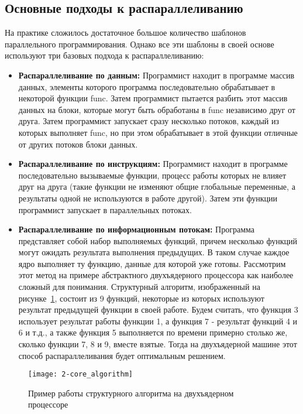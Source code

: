 \subsection{Основные подходы к распараллеливанию}

На практике сложилось достаточное большое количество шаблонов параллельного программирования.
Однако все эти шаблоны в своей основе используют три базовых подхода к распараллеливанию:

\begin{itemize}
    \item\textbf{Распараллеливание по данным:} Программист находит в программе массив данных, элементы которого программа последовательно обрабатывает в некоторой функции func.
    Затем программист пытается разбить этот массив данных на блоки, которые могут быть обработаны в func независимо друг от друга.
    Затем программист запускает сразу несколько потоков, каждый из которых выполняет func, но при этом обрабатывает в этой функции отличные от других потоков блоки данных.
    \item\textbf{Распараллеливание по инструкциям:} Программист находит в программе последовательно вызываемые функции, процесс работы которых не влияет друг на друга (такие функции не изменяют общие глобальные переменные, а результаты одной не используются в работе другой).
    Затем эти функции программист запускает в параллельных потоках.
    \item\textbf{Распараллеливание по информационным потокам:} Программа представляет собой набор выполняемых функций, причем несколько функций могут ожидать результата выполнения предыдущих.
    В таком случае каждое ядро выполняет ту функцию, данные для которой уже готовы.
    Рассмотрим этот метод на примере абстрактного двухъядерного процессора как наиболее сложный для понимания.
    Структурный алгоритм, изображенный на рисунке~\ref{structAlgorithm:image}, состоит из 9 функций, некоторые из которых используют результат предыдущей функции в своей работе.
    Будем считать, что функция 3 использует результат работы функции 1, а функция 7 - результат функций 4 и 6 и т.д., а также функция 5 выполняется по времени примерно столько же, сколько функции 7, 8 и 9, вместе взятые.
    Тогда на двухъядерной машине этот способ распараллеливания будет оптимальным решением.
\end{itemize}

\begin{figure}[H]
    \texttt{[image: 2-core\_algorithm]}
    \caption{Пример работы структурного алгоритма на двухъядерном процессоре}
    \label{structAlgorithm:image}
\end{figure}

